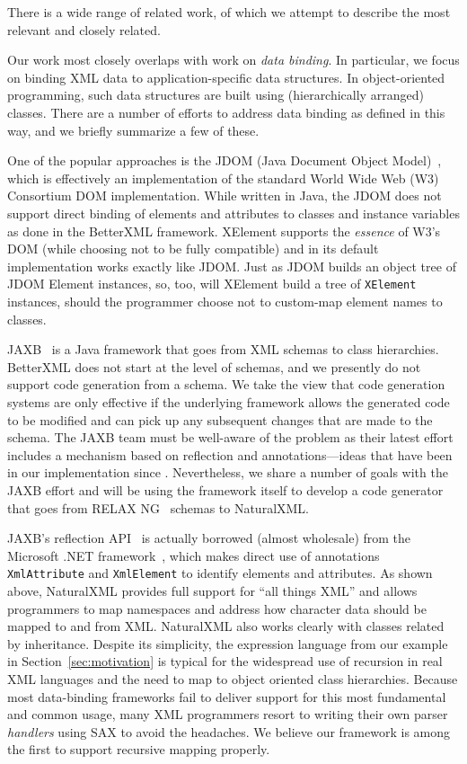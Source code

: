 There is a wide range of related work, of which we attempt to describe
the most relevant and closely related.

Our work most closely overlaps with work on \emph{data binding}. In
particular, we focus on binding XML data to application-specific data
structures. In object-oriented programming, such data structures are
built using (hierarchically arranged) classes. There are a number of
efforts to address data binding as defined in this way, and we briefly
summarize a few of these.

One of the popular approaches is the JDOM (Java Document Object
Model)~\cite{jdom}, which is effectively an implementation of the
standard World Wide Web (W3) Consortium DOM implementation. While
written in Java, the JDOM does not support direct binding of elements
and attributes to classes and instance variables as done in the
BetterXML framework. XElement supports the \emph{essence} of W3's DOM
(while choosing not to be fully compatible) and in its default
implementation works exactly like JDOM.  Just as JDOM builds an object
tree of JDOM Element instances, so, too, will XElement build a tree of
\lstinline{XElement} instances, should the programmer choose not to
custom-map element names to classes.


JAXB~\cite{ort:JAXB03} is a Java framework that goes from XML schemas
to class hierarchies. BetterXML does not start at the level of
schemas, and we presently do not support code generation from a
schema. We take the view that code generation systems are only
effective if the underlying framework allows the generated code to be
modified and can pick up any subsequent changes that are made to the
schema. The JAXB team must be well-aware of the problem as their
latest effort includes a mechanism based on reflection and
annotations---ideas that have been in our implementation since
\cite{gkt:natXml04}. Nevertheless, we share a number of goals with the
JAXB effort and will be using the framework itself to develop a code
generator that goes from RELAX NG~\cite{relaxng} schemas to
NaturalXML.

JAXB's reflection API~\cite{jaxbReflect} is actually borrowed (almost
wholesale) from the Microsoft .NET framework~\cite{microsoftxml},
which makes direct use of annotations \lstinline{XmlAttribute} and
\lstinline{XmlElement} to identify elements and attributes. As shown
above, NaturalXML provides full support for ``all things XML'' and
allows programmers to map namespaces and address how character data
should be mapped to and from XML. NaturalXML also works clearly with
classes related by inheritance. Despite its simplicity, the expression
language from our example in Section~\ref{sec:motivation} is typical
for the widespread use of recursion in real XML languages and the need
to map to object oriented class hierarchies. Because most data-binding
frameworks fail to deliver support for this most fundamental and
common usage, many XML programmers resort to writing their own parser
\emph{handlers} using SAX to avoid the headaches. We believe our
framework is among the first to support recursive mapping properly.

